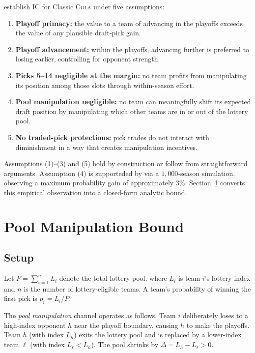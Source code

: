 \documentclass{article}
\newcommand{\cola}{\textup{\textsc{Cola}}}
\begin{document}
\citet{highley2026cola} establish IC for Classic \cola{} under five assumptions:
\begin{enumerate}
    \item \textbf{Playoff primacy:} the value to a team of advancing in the playoffs exceeds the value of any plausible draft-pick gain.
    \item \textbf{Playoff advancement:} within the playoffs, advancing further is preferred to losing earlier, controlling for opponent strength.
    \item \textbf{Picks 5--14 negligible at the margin:} no team profits from manipulating its position among those slots through within-season effort.
    \item \textbf{Pool manipulation negligible:} no team can meaningfully shift its expected draft position by manipulating which other teams are in or out of the lottery pool.
    \item \textbf{No traded-pick protections:} pick trades do not interact with diminishment in a way that creates manipulation incentives.
\end{enumerate}
Assumptions (1)--(3) and (5) hold by construction or follow from straightforward arguments. Assumption (4) is supporteded by \citet{highley2026cola} via a $1{,}000$-season simulation, observing a maximum probability gain of approximately $3\%$. Section~\ref{sec:bound} converts this empirical observation into a closed-form analytic bound.

\section{Pool Manipulation Bound}
\label{sec:bound}

\subsection{Setup}

Let $P = \sum_{i=1}^{n} L_i$ denote the total lottery pool, where $L_i$ is team $i$'s lottery index and $n$ is the number of lottery-eligible teams. A team's probability of winning the first pick is $p_i = L_i / P$.

The \emph{pool manipulation} channel operates as follows. Team $i$ deliberately loses to a high-index opponent $h$ near the playoff boundary, causing $h$ to make the playoffs. Team $h$ (with index $L_h$) exits the lottery pool and is replaced by a lower-index team $\ell$ (with index $L_\ell < L_h$). The pool shrinks by $\Delta = L_h - L_\ell > 0$.
\end{document}

